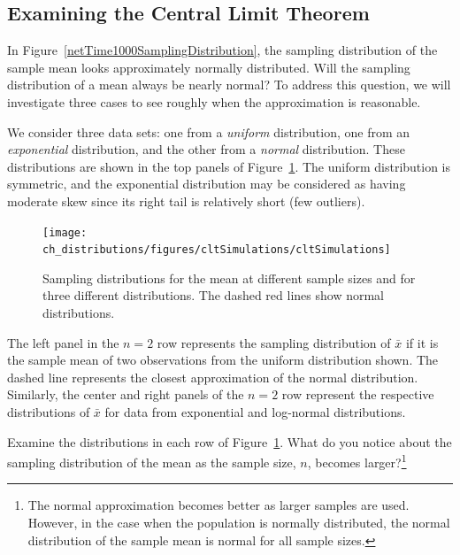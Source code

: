 \subsection{Examining the Central Limit Theorem}
\label{cltSection}


In Figure~\ref{netTime1000SamplingDistribution}, the sampling distribution of the sample mean looks approximately normally distributed. Will the sampling distribution of a mean always be nearly normal? To address this question, we will investigate three cases to see roughly when the approximation is reasonable.

We consider three data sets: one from a \emph{uniform} distribution, one from an \emph{exponential} distribution, and the other from a \emph{normal} distribution. These distributions are shown in the top panels of Figure~\ref{cltSimulations}. The uniform distribution is symmetric, and the exponential distribution may be considered as having moderate skew since its right tail is relatively short (few outliers).

\begin{figure}
   \centering
   \texttt{[image: ch\_distributions/figures/cltSimulations/cltSimulations]}
   \caption{Sampling distributions for the mean at different sample sizes and for three different distributions. The dashed red lines show normal distributions.}
   \label{cltSimulations}
\end{figure}

The left panel in the $n=2$ row represents the sampling distribution of $\bar{x}$ if it is the sample mean of two observations from the uniform distribution shown. The dashed line represents the closest approximation of the normal distribution. Similarly, the center and right panels of the $n=2$ row represent the respective distributions of $\bar{x}$ for data from exponential and log-normal distributions.

\begin{exercise}
Examine the distributions in each row of Figure~\ref{cltSimulations}. What do you notice about the sampling distribution of the mean as the sample size, $n$, becomes larger?\footnote{The normal approximation becomes better as larger samples are used. However, in the case when the population is normally distributed, the normal distribution of the sample mean is normal for all sample sizes.}
\end{exercise}


